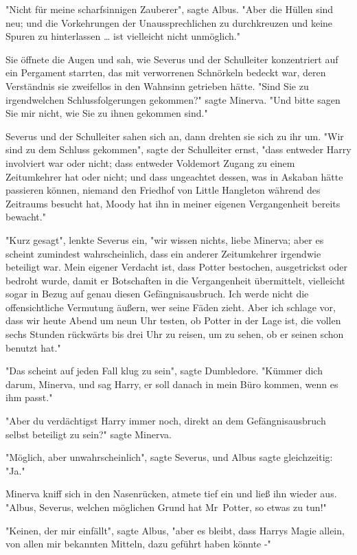 {"Nicht für meine scharfsinnigen Zauberer", sagte Albus. "Aber die Hüllen sind neu; und die Vorkehrungen der Unaussprechlichen zu durchkreuzen und keine Spuren zu hinterlassen … ist vielleicht nicht unmöglich."

Sie öffnete die Augen und sah, wie Severus und der Schulleiter konzentriert auf ein Pergament starrten, das mit verworrenen Schnörkeln bedeckt war, deren Verständnis sie zweifellos in den Wahnsinn getrieben hätte. "Sind Sie zu irgendwelchen Schlussfolgerungen gekommen?" sagte Minerva. "Und bitte sagen Sie mir nicht, wie Sie zu ihnen gekommen sind."

Severus und der Schulleiter sahen sich an, dann drehten sie sich zu ihr um. "Wir sind zu dem Schluss gekommen", sagte der Schulleiter ernst, "dass entweder Harry involviert war oder nicht; dass entweder Voldemort Zugang zu einem Zeitumkehrer hat oder nicht; und dass ungeachtet dessen, was in Askaban hätte passieren können, niemand den Friedhof von Little Hangleton während des Zeitraums besucht hat, Moody hat ihn in meiner eigenen Vergangenheit bereits bewacht."

"Kurz gesagt", lenkte Severus ein, "wir wissen nichts, liebe Minerva; aber es scheint zumindest wahrscheinlich, dass ein anderer Zeitumkehrer irgendwie beteiligt war. Mein eigener Verdacht ist, dass Potter bestochen, ausgetrickst oder bedroht wurde, damit er Botschaften in die Vergangenheit übermittelt, vielleicht sogar in Bezug auf genau diesen Gefängnisausbruch. Ich werde nicht die offensichtliche Vermutung äußern, wer seine Fäden zieht. Aber ich schlage vor, dass wir heute Abend um neun Uhr testen, ob Potter in der Lage ist, die vollen sechs Stunden rückwärts bis drei Uhr zu reisen, um zu sehen, ob er seinen schon benutzt hat."

"Das scheint auf jeden Fall klug zu sein", sagte Dumbledore. "Kümmer dich darum, Minerva, und sag Harry, er soll danach in mein Büro kommen, wenn es ihm passt."

"Aber du verdächtigst Harry immer noch, direkt an dem Gefängnisausbruch selbst beteiligt zu sein?" sagte Minerva.

"Möglich, aber unwahrscheinlich", sagte Severus, und Albus sagte gleichzeitig: "Ja."

Minerva kniff sich in den Nasenrücken, atmete tief ein und ließ ihn wieder aus. "Albus, Severus, welchen möglichen Grund hat Mr~Potter, so etwas zu tun!"

"Keinen, der mir einfällt", sagte Albus, "aber es bleibt, dass Harrys Magie allein, von allen mir bekannten Mitteln, dazu geführt haben könnte -"

}
